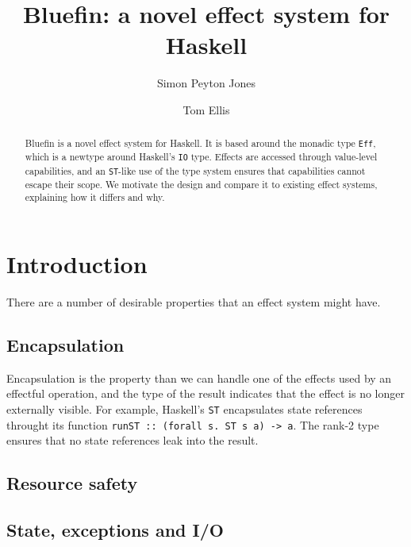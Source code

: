 \documentclass[sigplan,screen]{acmart}
\begin{document}
\title{Bluefin: a novel effect system for Haskell}

\author{Simon Peyton Jones}

\author{Tom Ellis}

\begin{abstract}
  Bluefin is a novel effect system for Haskell.  It is based around
  the monadic type \texttt{Eff}, which is a newtype around Haskell's
  \texttt{IO} type.  Effects are accessed through value-level
  capabilities, and an \texttt{ST}-like use of the type system ensures
  that capabilities cannot escape their scope.  We motivate the design
  and compare it to existing effect systems, explaining how it differs
  and why.
\end{abstract}

\maketitle

\section{Introduction}

There are a number of desirable properties that an effect system might
have.

\subsection{Encapsulation}

Encapsulation is the property than we can handle one of the effects
used by an effectful operation, and the type of the result indicates
that the effect is no longer externally visible.  For example,
Haskell's \texttt{ST} encapsulates state references throught its
function \texttt{runST :: (forall s. ST s a) -> a}.  The rank-2 type
ensures that no state references leak into the result.

\subsection{Resource safety}

\subsection{State, exceptions and I/O}
\end{document}
